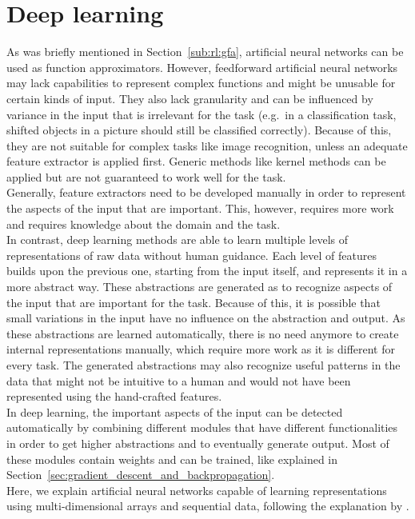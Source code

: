 \chapter{Deep learning}
\label{cha:deep_learning}

As was briefly mentioned in Section~\ref{sub:rl:gfa}, artificial neural networks can be used as function approximators.
However, feedforward artificial neural networks may lack capabilities to represent complex functions and might be unusable for certain kinds of input. They also lack granularity and can be influenced by variance in the input that is irrelevant for the task (e.g.\ in a classification task, shifted objects in a picture should still be classified correctly). Because of this, they are not suitable for complex tasks like image recognition, unless an adequate feature extractor is applied first. Generic methods like kernel methods can be applied but are not guaranteed to work well for the task.\\
Generally, feature extractors need to be developed manually in order to represent the aspects of the input that are important. This, however, requires more work and requires knowledge about the domain and the task.\\

In contrast, deep learning methods are able to learn multiple levels of representations of raw data without human guidance.
Each level of features builds upon the previous one, starting from the input itself, and represents it in a more abstract way. These abstractions are generated as to recognize aspects of the input that are important for the task. Because of this, it is possible that small variations in the input have no influence on the abstraction and output.
As these abstractions are learned automatically, there is no need anymore to create internal representations manually, which require more work as it is different for every task. The generated abstractions may also recognize useful patterns in the data that might not be intuitive to a human and would not have been represented using the hand-crafted features.\\

In deep learning, the important aspects of the input can be detected automatically by combining different modules that have different functionalities in order to get higher abstractions and to eventually generate output.
Most of these modules contain weights and can be trained, like explained in Section~\ref{sec:gradient_descent_and_backpropagation}.\\
Here, we explain artificial neural networks capable of learning representations using multi-dimensional arrays and sequential data, following the explanation by \cite{LeCun2015DeepLearning}.

